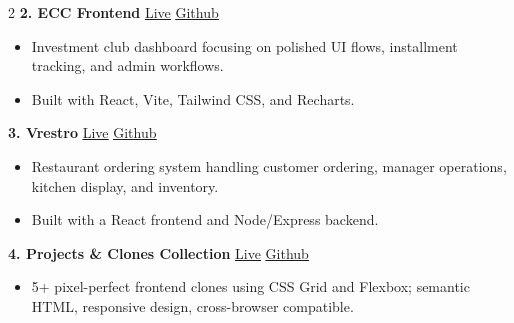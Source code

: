 \documentclass[letterpaper,10pt]{article}
\begin{document}
\begin{paracol}{2}
\vspace{4pt}
\noindent\textbf{2. ECC Frontend} \hfill \href{https://ecc-gamma.vercel.app/}{\small\underline{Live}} \enspace \href{https://github.com/KHUSHPATEL143/ECC-frontend}{\small\underline{Github}}
\begin{itemize}
  \item \small Investment club dashboard focusing on polished UI flows, installment tracking, and admin workflows.
  \item \small Built with React, Vite, Tailwind CSS, and Recharts.
\end{itemize}

\vspace{4pt}
\noindent\textbf{3. Vrestro} \hfill \href{https://restaurant-oc42.vercel.app/}{\small\underline{Live}} \enspace \href{https://github.com/KHUSHPATEL143/Vrestro}{\small\underline{Github}}
\begin{itemize}
  \item \small Restaurant ordering system handling customer ordering, manager operations, kitchen display, and inventory.
  \item \small Built with a React frontend and Node/Express backend.
\end{itemize}

\vspace{4pt}
\noindent\textbf{4. Projects \& Clones Collection} \hfill \href{https://projectsandclone.vercel.app/}{\small\underline{Live}} \enspace \href{https://github.com/KHUSHPATEL143/Projects_and-_CloneinHTML-CSS-JS}{\small\underline{Github}}
\begin{itemize}
  \item \small 5+ pixel-perfect frontend clones using CSS Grid and Flexbox; semantic HTML, responsive design, cross-browser compatible.
\end{itemize}

\end{paracol}
\end{document}
